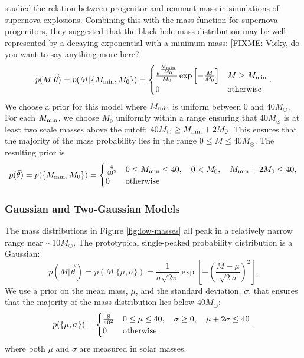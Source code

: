 \documentclass[preprint]{aastex}
\newcommand{\fixme}[1]{[FIXME: #1]}
\newcommand{\Msun}{M_\odot}
\newcommand{\Mmin}{M_{\textnormal{min}}}
\newcommand{\vtheta}{\vec{\theta}}
\begin{document}
\citet{Fryer2001} studied the relation between progenitor and remnant
mass in simulations of supernova explosions.  Combining this with the
mass function for supernova progenitors, they suggested that the
black-hole mass distribution may be well-represented by a decaying
exponential with a minimum mass: \fixme{Vicky, do you want to say
  anything more here?}
\begin{equation}
  \label{eq:exp-def}
  p(M|\vtheta) = p(M|\{\Mmin, M_0\}) = 
  \begin{cases}
    \frac{e^{\frac{\Mmin}{M_0}}}{M_0} \exp \left[ - \frac{M}{M_0}
    \right] & M \geq \Mmin \\
    0 & \textnormal{otherwise}
  \end{cases}.
\end{equation}
We choose a prior for this model where $\Mmin$ is uniform between 0
and $40 \Msun$.  For each $\Mmin$, we choose $M_0$ uniformly within a
range ensuring that $40\Msun$ is at least two scale masses above the
cutoff: $40\Msun \geq \Mmin + 2 M_0$.  This ensures that the majority
of the mass probability lies in the range $0 \leq M \leq 40\Msun$.
The resulting prior is
\begin{equation}
  p(\vtheta) = p(\{\Mmin, M_0\}) = 
  \begin{cases}
    \frac{4}{40^2} & 0 \leq \Mmin \leq 40, \quad 0 < M_0, \quad \Mmin
    + 2 M_0 \leq 40, \\
    0 & \textnormal{otherwise}
  \end{cases}
\end{equation}

\subsubsection{Gaussian and Two-Gaussian Models}
\label{sec:gaussian}

The mass distributions in Figure \ref{fig:low-masses} all peak in a
relatively narrow range near $\sim 10 \Msun$.  The prototypical
single-peaked probability distribution is a Gaussian:
\begin{equation}
  \label{eq:gaussian-def}
  p(M|\vtheta) = p(M|\{\mu, \sigma\}) = \frac{1}{\sigma \sqrt{2\pi}}
  \exp\left[ - \left(\frac{M - \mu}{\sqrt{2} \sigma} \right)^2 \right].
\end{equation}
We use a prior on the mean mass, $\mu$, and the standard deviation,
$\sigma$, that ensures that the majority of the mass distribution lies
below $40 \Msun$:
\begin{equation}
  \label{eq:gaussian-prior-def}
  p(\{\mu,\sigma\}) = 
  \begin{cases}
    \frac{8}{40^2} & 0 \leq \mu \leq 40, \quad \sigma \geq 0, \quad
    \mu + 2\sigma \leq 40 \\
    0 & \textnormal{otherwise}
  \end{cases},
\end{equation}
where both $\mu$ and $\sigma$ are measured in solar masses.  
\end{document}
